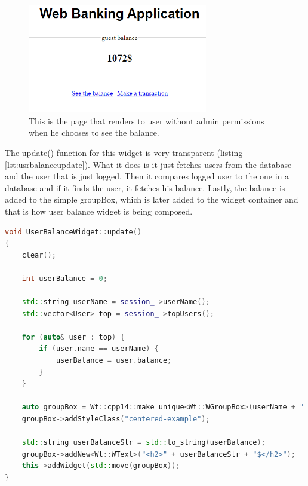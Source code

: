 \documentclass[a4paper,12pt]{book}
\begin{document}
{{\begin{figure}[H]
\centering
\includegraphics[width=0.7\textwidth]{balance}
\caption{This is the page that renders to user without admin permissions when he chooses to see the balance.}
\label{fig:userbalancewidget}
\end{figure}

The update() function for this widget is very transparent (listing \ref{lst:usrbalanceupdate}). What it does is it just fetches users from the database and the user that is just logged. Then it compares logged user to the one in a database and if it finds the user, it fetches his balance. Lastly, the balance is added to the simple groupBox, which is later added to the widget container and that is how user balance widget is being composed.

\bigskip
\begin{lstlisting}[frame=single, label={lst:usrbalanceupdate}, basicstyle=\small, language=C++, caption={UserBalanceWidget::update() function.}, captionpos=b]
void UserBalanceWidget::update()
{
	clear();

	int userBalance = 0;

	std::string userName = session_->userName();
	std::vector<User> top = session_->topUsers();

	for (auto& user : top) {
		if (user.name == userName) {
			userBalance = user.balance;
		}
	}

	auto groupBox = Wt::cpp14::make_unique<Wt::WGroupBox>(userName + " balance");
	groupBox->addStyleClass("centered-example");

	std::string userBalanceStr = std::to_string(userBalance);
	groupBox->addNew<Wt::WText>("<h2>" + userBalanceStr + "$</h2>");
	this->addWidget(std::move(groupBox));
}
\end{lstlisting}
}

}
\end{document}
